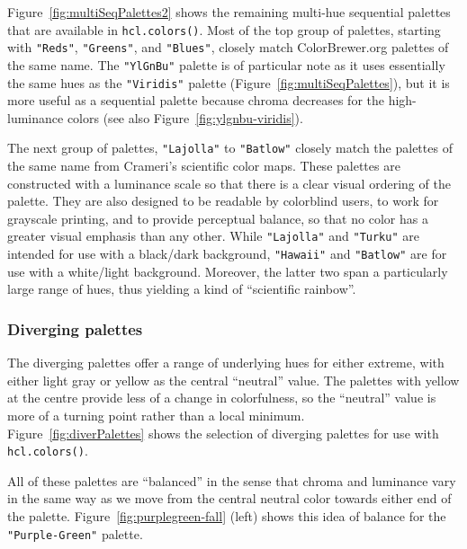 Figure~\ref{fig:multiSeqPalettes2} shows the remaining multi-hue
sequential palettes that are available in \texttt{hcl.colors()}.
Most of the top group of palettes, starting with \texttt{"Reds"}, \texttt{"Greens"},
and \texttt{"Blues"}, closely match ColorBrewer.org palettes
of the same name. The \texttt{"YlGnBu"} palette is of particular note
as it uses essentially the same hues as the \texttt{"Viridis"} palette
(Figure~\ref{fig:multiSeqPalettes}), but it is more useful as a
sequential palette because chroma decreases for the high-luminance
colors (see also Figure~\ref{fig:ylgnbu-viridis}).

The next group of palettes, \texttt{"Lajolla"} to \texttt{"Batlow"} closely match the
palettes of the same name from Crameri's scientific color maps.
These palettes are constructed with a luminance scale
so that there is a clear visual ordering of the palette.
They are also designed to be readable by colorblind users,
to work for grayscale printing, and to provide perceptual balance, so
that no color has a greater visual emphasis than any other.
While \texttt{"Lajolla"} and \texttt{"Turku"} are intended for use with a black/dark
background, \texttt{"Hawaii"} and \texttt{"Batlow"} are for use with a white/light background.
Moreover, the latter two span a particularly large range of hues, thus
yielding a kind of ``scientific rainbow''.

\hypertarget{diverging-palettes}{%
\subsubsection{Diverging palettes}\label{diverging-palettes}}

The diverging palettes offer a range of underlying hues
for either extreme, with either light gray or yellow as the central ``neutral''
value. The palettes with yellow at the centre provide less of a
change in colorfulness, so the ``neutral'' value is more of
a turning point rather than a local minimum.\\
Figure~\ref{fig:diverPalettes} shows the selection of diverging
palettes for use with \texttt{hcl.colors()}.

All of these palettes are ``balanced'' in the sense that chroma and luminance
vary in the same way as we move from the central neutral color towards
either end of the palette.
Figure~\ref{fig:purplegreen-fall} (left) shows this idea of balance for
the \texttt{"Purple-Green"} palette.

